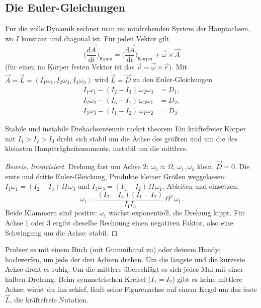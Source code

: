 \documentclass[deutsch]{kaelearn}
\newcommand\dd{\mathrm{d}}
\begin{document}
\subsection{Die Euler-Gleichungen}
Für die volle Dynamik rechnet man im mitdrehenden System der Hauptachsen, wo $I$ konstant und diagonal ist. Für jeden Vektor gilt
\[
  \Big(\frac{\dd\vec A}{\dd t}\Big)_{\text{Raum}} = \Big(\frac{\dd\vec A}{\dd t}\Big)_{\text{Körper}}+\vec\omega\times\vec A
\]
(für einen im Körper festen Vektor ist das $\vec v = \vec\omega\times\vec r$). Mit $\vec A = \vec L = (I_1\omega_1,I_2\omega_2,I_3\omega_3)$ wird
$\dot{\vec L} = \vec D$ zu den Euler-Gleichungen
\begin{align*}
  I_1\dot\omega_1-(I_2-I_3)\,\omega_2\omega_3 &= D_1,\\
  I_2\dot\omega_2-(I_3-I_1)\,\omega_3\omega_1 &= D_2,\\
  I_3\dot\omega_3-(I_1-I_2)\,\omega_1\omega_2 &= D_3 .
\end{align*}

\begin{theorem}{Stabile und instabile Drehachsen}{tennis racket theorem}
Ein kräftefreier Körper mit $I_1>I_2>I_3$ dreht sich stabil um die Achse des größten und um die des kleinsten Hauptträgheitsmoments,
instabil um die mittlere.
\end{theorem}
\begin{proof}[Beweis, linearisiert]
Drehung fast um Achse 2: $\omega_2\approx\Omega$, $\omega_1,\omega_3$ klein, $\vec D = 0$. Die erste und dritte Euler-Gleichung, Produkte
kleiner Größen weggelassen: $I_1\dot\omega_1 = (I_2-I_3)\,\Omega\,\omega_3$ und $I_3\dot\omega_3 = (I_1-I_2)\,\Omega\,\omega_1$. Ableiten und
einsetzen:
\[
  \ddot\omega_1 = \frac{(I_2-I_3)(I_1-I_2)}{I_1I_3}\,\Omega^2\,\omega_1 .
\]
Beide Klammern sind positiv: $\omega_1$ wächst exponentiell, die Drehung kippt. Für Achse 1 oder 3 ergibt dieselbe Rechnung einen
negativen Faktor, also eine Schwingung um die Achse: stabil.
\end{proof}

Probier es mit einem Buch (mit Gummiband zu) oder deinem Handy: hochwerfen, um jede der drei Achsen drehen. Um die längste und die kürzeste
Achse dreht es ruhig. Um die mittlere überschlägt es sich jedes Mal mit einer halben Drehung. Beim symmetrischen Kreisel ($I_1 = I_2$)
gibt es keine mittlere Achse; wirfst du ihn schief, läuft seine Figurenachse auf einem Kegel um das feste $\vec L$, die kräftefreie Nutation.
\end{document}
